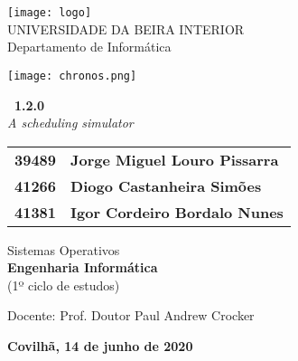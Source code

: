 \begin{titlepage}
\begin{center}

\begin{flushleft}
\texttt{[image: logo]}\\
\rostoubi UNIVERSIDADE DA BEIRA INTERIOR\\
\rostofac Departamento de Informática\\
\end{flushleft}

\vspace{1.5cm}

\begin{center}
\texttt{[image: chronos.png]}
\end{center}

\rostotitulo \textbf{\chronOS~1.2.0} \\
\rostosubtit \textit{A scheduling simulator}\\

\vspace{1.8cm}

\begin{tabular}{>{\rostonomes\bfseries}l @{\rostonomes\bfseries~---~} >{\rostonomes\bfseries}l}
	39489 & Jorge Miguel Louro Pissarra \\
	41266 & Diogo Castanheira Simões \\
	41381 & Igor Cordeiro Bordalo Nunes \\
\end{tabular}

\vspace{1.4cm}

\rostooutros Sistemas Operativos\\
\rostonomes \textbf{Engenharia Informática}\\
\rostooutros (1º ciclo de estudos)\\

\vspace{2.1cm}

\rostooutros Docente: Prof. Doutor Paul Andrew Crocker\\

\vspace{1.2cm}

\rostooutros \textbf{Covilhã, 14 de junho de 2020}

\end{center}
\end{titlepage}

